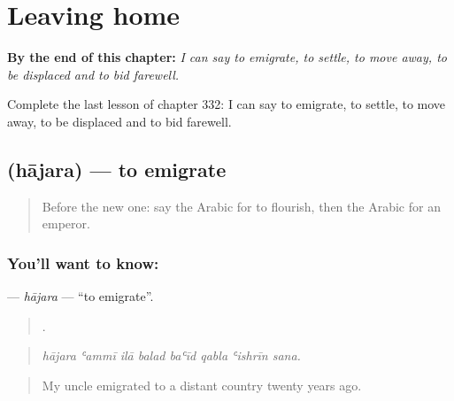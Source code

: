 
\chapter{Leaving home}
\label{ch:ar-leaving-home}

\begin{chapteropening}
\textbf{By the end of this chapter:} \emph{I can say to emigrate, to settle, to move away, to be displaced and to bid farewell.}

Complete the last lesson of chapter 332: I can say to emigrate, to settle, to move away, to be displaced and to bid farewell.
\end{chapteropening}

\section[\texorpdfstring{\ar{هاجر} (hājara)}{هاجر (hājara)}]{ (hājara) — to emigrate}

\label{lesson:AR-C332-hajara-emigrate}



\begin{quote}
Before the new one: say the Arabic for to flourish, then the Arabic for an emperor.
\end{quote}

\subsection*{You'll want to know: }
\textbf{} — \emph{hājara} — \textquotedblleft{}to emigrate\textquotedblright{}.

\begin{quote}
       .
\end{quote}

\begin{quote}
\emph{hājara ʿammī ilā balad baʿīd qabla ʿishrīn sana.}
\end{quote}

\begin{quote}
My uncle emigrated to a distant country twenty years ago.
\end{quote}

